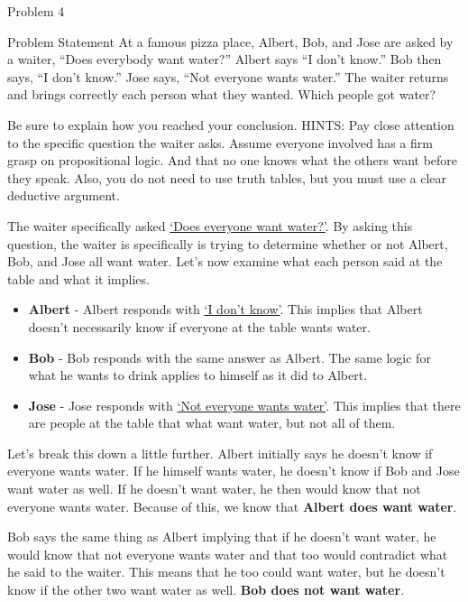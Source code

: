 \begin{problem}{Problem 4}
    \begin{statement}{Problem Statement}
        At a famous pizza place, Albert, Bob, and Jose are asked by a waiter, “Does everybody want water?” Albert says “I don’t know.”  Bob then says, “I don’t know.” Jose says, “Not everyone wants water.” 
        The waiter returns and brings correctly each person what they wanted.  Which people got water?

        Be sure to explain how you reached your conclusion. HINTS: Pay close attention to the specific question the waiter asks.  Assume everyone involved has a firm grasp on propositional logic. And that no 
        one knows what the others want before they speak. Also, you do not need to use truth tables, but you must use a clear deductive argument.
    \end{statement}

    \begin{Highlight}[Solution]
        The waiter specifically asked \underline{`Does everyone want water?'}. By asking this question, the waiter is specifically is trying to determine whether or not Albert, Bob, and Jose all want water.
        Let's now examine what each person said at the table and what it implies.

        \begin{itemize}
            \item \textbf{Albert} - Albert responds with \underline{`I don't know'}. This implies that Albert doesn't necessarily know if everyone at the table wants water.
            \item \textbf{Bob} - Bob responds with the same answer as Albert. The same logic for what he wants to drink applies to himself as it did to Albert.
            \item \textbf{Jose} - Jose responds with \underline{`Not everyone wants water'}. This implies that there are people at the table that what want water, but not all of them.
        \end{itemize}

        Let's break this down a little further. Albert initially says he doesn't know if everyone wants water. If he himself wants water, he doesn't know if Bob and Jose want water as well. If he doesn't
        want water, he then would know that not everyone wants water. Because of this, we know that \textbf{Albert does want water}.

        Bob says the same thing as Albert implying that if he doesn't want water, he would know that not everyone wants water and that too would contradict what he said to the waiter. This means that he too could
        want water, but he doesn't know if the other two want water as well. \textbf{Bob does not want water}.


\end{Highlight}
\end{problem}
